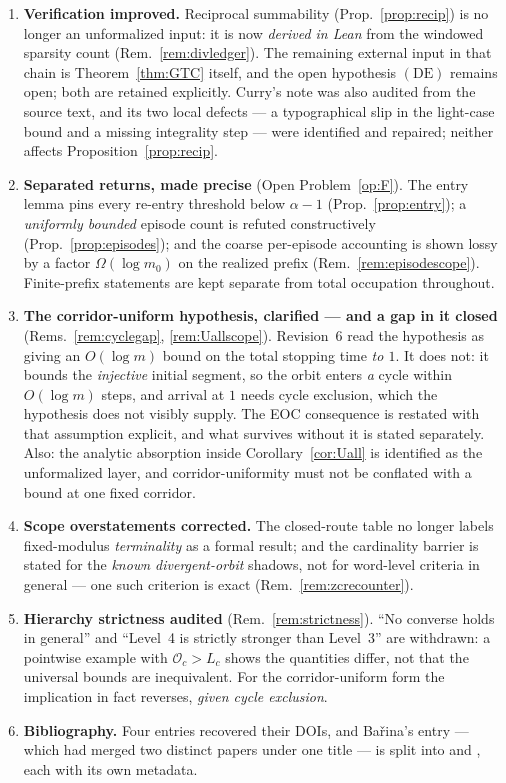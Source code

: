 \documentclass[11pt]{article}
\theoremstyle{plain}
\theoremstyle{definition}
\theoremstyle{remark}
\newcommand{\Occ}{\mathcal{O}}
\newcommand{\al}{\alpha}
\begin{document}
\begin{enumerate}[leftmargin=1.6em]
\item \textbf{Verification improved.} Reciprocal summability (Prop.~\ref{prop:recip}) is no longer
  an unformalized input: it is now \emph{derived in Lean} from the windowed sparsity count
  (Rem.~\ref{rem:divledger}). The remaining external input in that chain is
  Theorem~\ref{thm:GTC} itself, and the open hypothesis $(\mathrm{DE})$ remains open; both are
  retained explicitly. Curry's note was also audited from the source text, and its two local
  defects --- a typographical slip in the light-case bound and a missing integrality step --- were
  identified and repaired; neither affects Proposition~\ref{prop:recip}.
\item \textbf{Separated returns, made precise} (Open Problem~\ref{op:F}). The entry lemma pins
  every re-entry threshold below $\al-1$ (Prop.~\ref{prop:entry}); a \emph{uniformly bounded}
  episode count is refuted constructively (Prop.~\ref{prop:episodes}); and the coarse per-episode
  accounting is shown lossy by a factor $\Omega(\log m_0)$ on the realized prefix
  (Rem.~\ref{rem:episodescope}). Finite-prefix statements are kept separate from total occupation
  throughout.
\item \textbf{The corridor-uniform hypothesis, clarified --- and a gap in it closed}
  (Rems.~\ref{rem:cyclegap}, \ref{rem:Uallscope}). Revision~6 read the hypothesis as giving an
  $O(\log m)$ bound on the total stopping time \emph{to $1$}. It does not: it bounds the
  \emph{injective} initial segment, so the orbit enters \emph{a} cycle within $O(\log m)$ steps,
  and arrival at $1$ needs cycle exclusion, which the hypothesis does not visibly supply. The EOC
  consequence is restated with that assumption explicit, and what survives without it is stated
  separately. Also: the analytic absorption inside Corollary~\ref{cor:Uall} is identified as the
  unformalized layer, and corridor-uniformity must not be conflated with a bound at one fixed
  corridor.
\item \textbf{Scope overstatements corrected.} The closed-route table no longer labels
  fixed-modulus \emph{terminality} as a formal result; and the cardinality barrier is stated for
  the \emph{known divergent-orbit} shadows, not for word-level criteria in general --- one such
  criterion is exact (Rem.~\ref{rem:zcrecounter}).
\item \textbf{Hierarchy strictness audited} (Rem.~\ref{rem:strictness}). ``No converse holds in
  general'' and ``Level~4 is strictly stronger than Level~3'' are withdrawn: a pointwise example
  with $\Occ_c>L_c$ shows the quantities differ, not that the universal bounds are inequivalent.
  For the corridor-uniform form the implication in fact reverses, \emph{given cycle exclusion}.
\item \textbf{Bibliography.} Four entries recovered their DOIs, and Ba\v{r}ina's entry --- which
  had merged two distinct papers under one title --- is split into
  \cite{Barina2021} and \cite{Barina2025}, each with its own metadata.
\end{enumerate}
\end{document}
